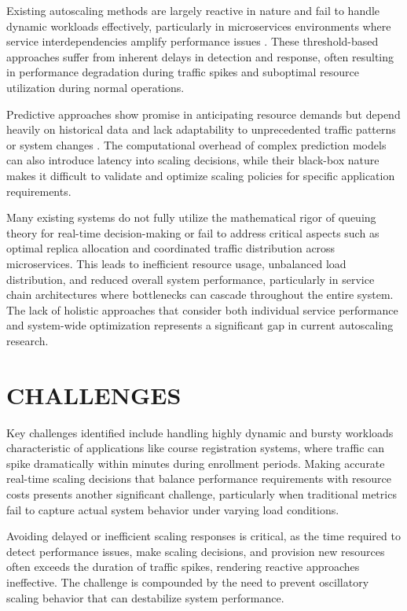 Existing autoscaling methods are largely reactive in nature and fail to handle dynamic workloads effectively, particularly in microservices environments where service interdependencies amplify performance issues \cite{khaleq2021}. These threshold-based approaches suffer from inherent delays in detection and response, often resulting in performance degradation during traffic spikes and suboptimal resource utilization during normal operations.

Predictive approaches show promise in anticipating resource demands but depend heavily on historical data and lack adaptability to unprecedented traffic patterns or system changes \cite{wang2024}. The computational overhead of complex prediction models can also introduce latency into scaling decisions, while their black-box nature makes it difficult to validate and optimize scaling policies for specific application requirements.

Many existing systems do not fully utilize the mathematical rigor of queuing theory for real-time decision-making or fail to address critical aspects such as optimal replica allocation and coordinated traffic distribution across microservices. This leads to inefficient resource usage, unbalanced load distribution, and reduced overall system performance, particularly in service chain architectures where bottlenecks can cascade throughout the entire system. The lack of holistic approaches that consider both individual service performance and system-wide optimization represents a significant gap in current autoscaling research.

\section{CHALLENGES}

Key challenges identified include handling highly dynamic and bursty workloads characteristic of applications like course registration systems, where traffic can spike dramatically within minutes during enrollment periods. Making accurate real-time scaling decisions that balance performance requirements with resource costs presents another significant challenge, particularly when traditional metrics fail to capture actual system behavior under varying load conditions.

Avoiding delayed or inefficient scaling responses is critical, as the time required to detect performance issues, make scaling decisions, and provision new resources often exceeds the duration of traffic spikes, rendering reactive approaches ineffective. The challenge is compounded by the need to prevent oscillatory scaling behavior that can destabilize system performance.

